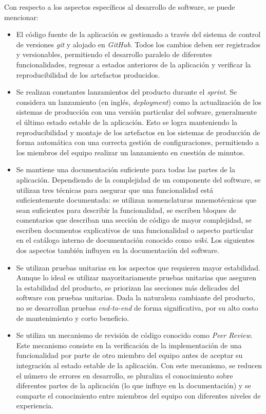 Con respecto a los aspectos específicos al desarrollo de software, se puede mencionar:

\begin{itemize}

  \item El código fuente de la aplicación es gestionado a través del sistema de control de versiones \textit{git} y alojado en \textit{GitHub}. Todos los cambios deben ser registrados y versionables, permitiendo el desarrollo paralelo de diferentes funcionalidades, regresar a estados anteriores de la aplicación y verificar la reproducibilidad de los artefactos producidos.

  \item Se realizan constantes lanzamientos del producto durante el \textit{sprint}. Se considera un lanzamiento (en inglés, \textit{deployment}) como la actualización de los sistemas de producción con una versión particular del sofware, generalmente el último estado estable de la aplicación. Esto se logra manteniendo la reproducibilidad y montaje de los artefactos en los sistemas de producción de forma automática con una correcta gestión de configuraciones, permitiendo a los miembros del equipo realizar un lanzamiento en cuestión de minutos.

  \item Se mantiene una documentación suficiente para todas las partes de la aplicación. Dependiendo de la complejidad de un componente del software, se utilizan tres técnicas para asegurar que una funcionalidad está suficientemente documentada: se utilizan nomenclaturas mnemotécnicas que sean suficientes para describir la funcionalidad, se escriben bloques de comentarios que describan una sección de código de mayor complejidad, se escriben documentos explicativos de una funcionalidad o aspecto particular en el catálogo interno de documentación conocido como \textit{wiki}. Los siguientes dos aspectos también influyen en la documentación del software.

  \item Se utilizan pruebas unitarias en los aspectos que requieren mayor estabilidad. Aunque lo ideal es utilizar mayoritariamente pruebas unitarias que aseguren la estabilidad del producto, se priorizan las secciones más delicades del software con pruebas unitarias. Dada la naturaleza cambiante del producto, no se desarrollan pruebas \textit{end-to-end} de forma significativa, por su alto costo de mantenimiento y corto beneficio.

  \item Se utiliza un mecanismo de revisión de código conocido como \textit{Peer Review}. Este mecanismo consiste en la verificación de la implementación de una funcionalidad por parte de otro miembro del equipo antes de aceptar su integración al estado estable de la aplicación. Con este mecanismo, se reducen el número de errores en desarrollo, se pluraliza el conocimiento sobre diferentes partes de la aplicación (lo que influye en la documentación) y se comparte el conocimiento entre miembros del equipo con diferentes niveles de experiencia.

\end{itemize}
